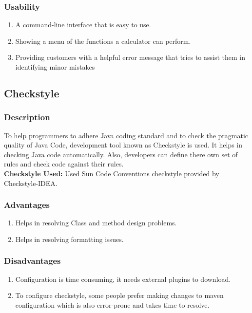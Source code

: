 \documentclass[a4paper,12pt]{report}
\begin{document}
\subsubsection{Usability}
\begin{enumerate}
   \item A command-line interface that is easy to use.
    \item Showing a menu of the functions a calculator can perform.
    \item Providing customers with a helpful error message that tries to assist them in identifying minor mistakes

\end{enumerate}



\subsection{Checkstyle}
\subsubsection{Description} To help programmers to adhere Java coding standard and to check the pragmatic quality of Java Code, development tool known as Checkstyle is used. It helps in checking Java code automatically. Also, developers can define there own set of rules and check code against their rules.\cite{b11}
\\\textbf{Checkstyle Used:} Used Sun Code Conventions checkstyle provided by Checkstyle-IDEA.


\subsubsection{Advantages}
\begin{enumerate}
    \item Helps in resolving Class and method design problems.\cite{b11}
    \item Helps in resolving formatting issues.\cite{b11}
\end{enumerate}
\subsubsection{Disadvantages}
\begin{enumerate}
    \item Configuration is time consuming, it needs external plugins to download.
    \item To configure checkstyle, some people prefer making changes to maven configuration which is also error-prone and takes time to resolve.
\end{enumerate}
\end{document}

